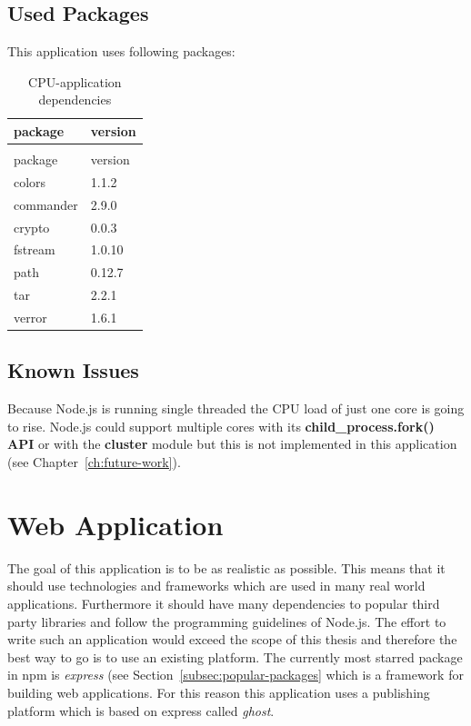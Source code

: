 	\subsection{Used Packages}
	This application uses following packages:
	\begin{longtable}{ll}
		\caption{CPU-application dependencies}\\
		package&version\\
		\hline
		\endfirsthead
		\caption[]{CPU-application dependencies}\\
		package&version\\
		\hline
		\endhead
		colors\cite{colors} & 1.1.2 \\
		commander\cite{commander} & 2.9.0 \\
		crypto\cite{crypto} & 0.0.3 \\
		fstream\cite{fstream} & 1.0.10 \\
		path\cite{path} & 0.12.7 \\
		tar\cite{tar} & 2.2.1 \\
		verror\cite{verror} & 1.6.1 \\
	\end{longtable}
	\subsection{Known Issues}
	\label{subsec:cpu-known-issues}
	Because Node.js is running single threaded the CPU load of just one core is going to rise. Node.js could support multiple cores with its \textbf{child\_process.fork() API} or with the \textbf{cluster} module but this is not implemented in this application (see Chapter~\ref{ch:future-work})\cite{nodejs-about}\cite{nodejs-childprocess}\cite{nodejs-cluster}.
	\section{Web Application}
	The goal of this application is to be as realistic as possible. This means that it should use technologies and frameworks which are used in many real world applications. Furthermore it should have many dependencies to popular third party libraries and follow the programming guidelines of Node.js. The effort to write such an application would exceed the scope of this thesis and therefore the best way to go is to use an existing platform. The currently most starred package in npm is \textit{express} (see Section~\ref{subsec:popular-packages} which is a framework for building web applications\cite{npm-starred}. For this reason this application uses a publishing platform which is based on express called \textit{ghost}\cite{ghost}\cite{ghost-git}.
